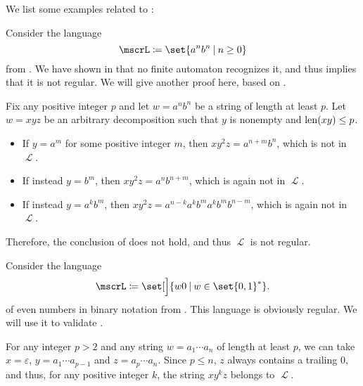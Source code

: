 \begin{example}\label{ex:thm:regular_pumping_lemma}
  We list some examples related to :
  \begin{thmenum}
     Consider the language
    \begin{equation*}
      \mscrL \coloneqq \set{ a^n b^n \given n \geq 0 }
    \end{equation*}
    from . We have shown in  that no finite automaton recognizes it, and thus  implies that it is not regular. We will give another proof here, based on .

    Fix any positive integer \( p \) and let \( w = a^n b^n \) be a string of length at least \( p \). Let \( w = xyz \) be an arbitrary decomposition such that \( y \) is nonempty and \( \operatorname{len}(xy) \leq p \).

    \begin{itemize}
      \item If \( y = a^m \) for some positive integer \( m \), then \( x y^2 z = a^{n + m} b^n \), which is not in \( \mscrL \).
      \item If instead \( y = b^m \), then \( x y^2 z = a^n b^{n + m} \), which is again not in \( \mscrL \).
      \item If instead \( y = a^k b^m \), then \( x y^2 z = a^{n-k} a^k b^m a^k b^m b^{n - m} \), which is again not in \( \mscrL \).
    \end{itemize}

    Therefore, the conclusion of  does not hold, and thus \( \mscrL \) is not regular.

     Consider the language
    \begin{equation*}
      \mscrL \coloneqq \set[\Big]{ w0 \given w \in \set{ 0, 1 }^* }.
    \end{equation*}
    of even numbers in binary notation from . This language is obviously regular. We will use it to validate .

    For any integer \( p > 2 \) and any string \( w = a_1 \cdots a_n \) of length at least \( p \), we can take \( x = \varepsilon \), \( y = a_1 \cdots a_{p-1} \) and \( z = a_p \cdots a_n \). Since \( p \leq n \), \( z \) always contains a trailing \( 0 \), and thus, for any positive integer \( k \), the string \( xy^kz \) belongs to \( \mscrL \).


\end{thmenum}
\end{example}
